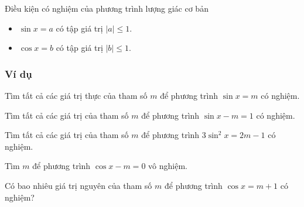 
\begin{dang}{Điều kiện có nghiệm của phương trình lượng giác cơ bản}
	\begin{itemize}
		\item $\sin x=a$ có tập giá trị $|a|\le 1$.
		\item $\cos x=b$ có tập giá trị $|b|\le 1$.
	\end{itemize}
\end{dang}
\subsubsection{Ví dụ}
\begin{vd}%
	Tìm tất cả các giá trị thực của tham số $m$ để phương trình $\sin x=m$ có nghiệm.
\end{vd}
\begin{vd}%
	Tìm tất cả các giá trị của tham số $m$ để phương trình $\sin x-m=1$ có nghiệm.
\end{vd}
\begin{vd}%
Tìm tất cả các giá trị của tham số $m$ để phương trình $3\sin^2x=2m-1$ có nghiệm.
\end{vd}

\begin{vd}%
	Tìm $m$ để phương trình $\cos x-m=0$ vô nghiệm.
\end{vd}
\begin{vd}%
	Có bao nhiêu giá trị nguyên của tham số $m$ để phương trình $\cos x=m+1$ có nghiệm?
\end{vd}

